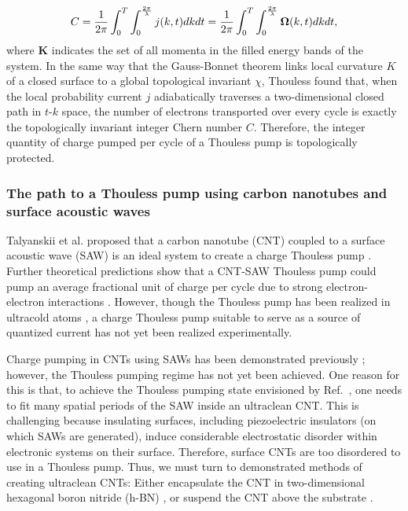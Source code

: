 \documentclass[double,12pt,1in,seploa]{beavtex}
\let\Oldsubsubsection\subsubsection
\renewcommand{\subsubsection}{\FloatBarrier\Oldsubsubsection}
\begin{document}
\begin{equation}
    C = \frac{1}{2\pi} \int_{0}^{T} \int_{0}^{\frac{2\pi}{\lambda}} j(k,t) dkdt = \frac{1}{2\pi} \int_{0}^{T} \int_{0}^{\frac{2\pi}{\lambda}} \vectorbold{\Omega}(k,t)dkdt, \label{Thouless Chern equation}
\end{equation}
where $\mathbf{K}$ indicates the set of all momenta in the filled energy bands of the system. In the same way that the Gauss-Bonnet theorem links local curvature $K$ of a closed surface to a global topological invariant $\chi$, Thouless found that, when the local probability current $j$ adiabatically traverses a two-dimensional closed path in $t\textrm{-}k$ space, the number of electrons transported over every cycle is exactly the topologically invariant integer Chern number $C$. Therefore, the integer quantity of charge pumped per cycle of a Thouless pump is topologically protected.


\subsubsection{The path to a Thouless pump using carbon nanotubes and surface acoustic waves}

Talyanskii et al. proposed that a carbon nanotube (CNT) coupled to a surface acoustic wave (SAW) is an ideal system to create a charge Thouless pump \cite{talyanskii_quantized_2001}. Further theoretical predictions show that a CNT-SAW Thouless pump could pump an average fractional unit of charge per cycle due to strong electron-electron interactions \cite{novikov_devils_2005}. However, though the Thouless pump has been realized in ultracold atoms \cite{citro_thouless_2023}, a charge Thouless pump suitable to serve as a source of quantized current has not yet been realized experimentally. 

Charge pumping in CNTs using SAWs has been demonstrated previously \cite{buitelaar_adiabatic_2008}; however, the Thouless pumping regime has not yet been achieved. One reason for this is that, to achieve the Thouless pumping state envisioned by Ref.\ \cite{talyanskii_quantized_2001}, one needs to fit many spatial periods of the SAW inside an ultraclean CNT. This is challenging because insulating surfaces, including piezoelectric insulators (on which SAWs are generated), induce considerable electrostatic disorder within electronic systems on their surface. Therefore, surface CNTs are too disordered to use in a Thouless pump. Thus, we must turn to demonstrated methods of creating ultraclean CNTs: Either encapsulate the CNT in two-dimensional hexagonal boron nitride (h-BN) \cite{huang_superior_2015}, or suspend the CNT above the substrate \cite{senger_universal_2018}. 
\end{document}
